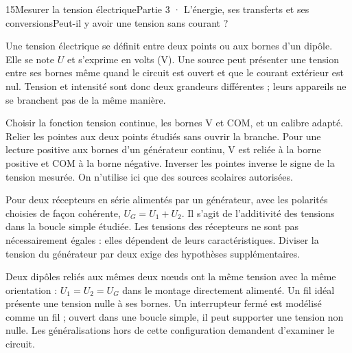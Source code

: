 \begin{ouverture}[college3]{15}{Mesurer la tension électrique}{Partie 3 · L’énergie, ses transferts et ses conversions}{Peut-il y avoir une tension sans courant ?}
\end{ouverture}
\label{ess-15}
Une tension électrique se définit entre deux points ou aux bornes d’un dipôle. Elle se note $U$ et s’exprime en volts (V). Une source peut présenter une tension entre ses bornes même quand le circuit est ouvert et que le courant extérieur est nul. Tension et intensité sont donc deux grandeurs différentes ; leurs appareils ne se branchent pas de la même manière.\par
{}
Choisir la fonction tension continue, les bornes V et COM, et un calibre adapté. Relier les pointes aux deux points étudiés sans ouvrir la branche. Pour une lecture positive aux bornes d’un générateur continu, V est reliée à la borne positive et COM à la borne négative. Inverser les pointes inverse le signe de la tension mesurée. On n’utilise ici que des sources scolaires autorisées.\par
\clearpage
{}
Pour deux récepteurs en série alimentés par un générateur, avec les polarités choisies de façon cohérente, $U_G=U_1+U_2$. Il s’agit de l’additivité des tensions dans la boucle simple étudiée. Les tensions des récepteurs ne sont pas nécessairement égales : elles dépendent de leurs caractéristiques. Diviser la tension du générateur par deux exige des hypothèses supplémentaires.\par
{}
Deux dipôles reliés aux mêmes deux nœuds ont la même tension avec la même orientation : $U_1=U_2=U_G$ dans le montage directement alimenté. Un fil idéal présente une tension nulle à ses bornes. Un interrupteur fermé est modélisé comme un fil ; ouvert dans une boucle simple, il peut supporter une tension non nulle. Les généralisations hors de cette configuration demandent d’examiner le circuit.\par

